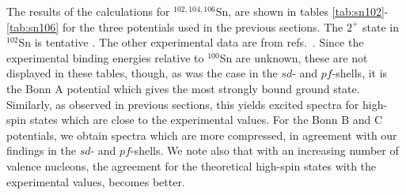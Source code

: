 The results of the calculations for $^{102, 104, 106}$Sn, are shown
in tables \ref{tab:sn102}-\ref{tab:sn106}
for the three
potentials used in the previous sections.
The $2^+$ state
in $^{102}$Sn is tentative \cite{janb93}. The other experimental
data are from refs.\ \cite{schu92,schu91,grawe92}.
Since the experimental binding energies relative to $^{100}$Sn are
unknown, these are not
displayed in these tables, though, as was the case in the
$sd$- and $pf$-shells, it is the Bonn A potential which gives
the most strongly bound ground state. Similarly, as observed in previous
sections, this yields excited spectra for high-spin states
which are close to the experimental values. For the Bonn B and
C potentials, we obtain spectra which are more compressed, in
agreement with our findings in the $sd$- and $pf$-shells.
We note also that with an increasing number of valence nucleons,
the agreement for the theoretical high-spin states with the
experimental values, becomes better.


